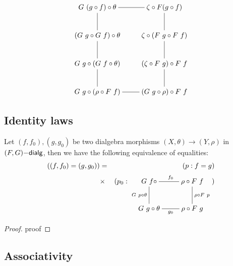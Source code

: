 $$
\xymatrix{
G\ (g \circ f) \circ \theta
\ar@{-}[r]
\ar@{-}[d]
&\zeta \circ F(g \circ f)
\ar@{-}[d]
\\
(G\ g \circ G\ f) \circ \theta
\ar@{-}[d]
&\zeta \circ (F\ g \circ F\ f)
\ar@{-}[d]
\\
G\ g \circ (G\ f \circ \theta)
\ar@{-}[d]
&(\zeta \circ F\ g) \circ F\ f
\ar@{-}[d]
\\
G\ g \circ (\rho \circ F\ f)
\ar@{-}[r]
&(G\ g \circ \rho) \circ F\ f
}
$$

\subsection{Identity laws}

\begin{proposition}
  Let $(f,f_0),(g,g_0)$ be two dialgebra morphisms
  $(X,\theta) \to (Y,\rho)$ in $(F,G)\mathsf{-dialg}$, then we have the
  following equivalence of equalities:
  \begin{align*}
    ((f,f_0) = (g,g_0)) &= &(p : f = g)\\
    &\times &(p_0 : 
              \xymatrix{
              G\ f \circ
              \ar@{-}[r]^{f_0}
              \ar@{-}[d]_{G\ p \circ \theta}
              &\rho \circ F\ f
              \ar@{-}[d]^{\rho \circ F\ p}
              \\
              G\ g \circ \theta
              \ar@{-}[r]_{g_0}
              &\rho \circ F\ g
              })
  \end{align*}
\end{proposition}

\begin{proof}
  proof
\end{proof}

\subsection{Associativity}

